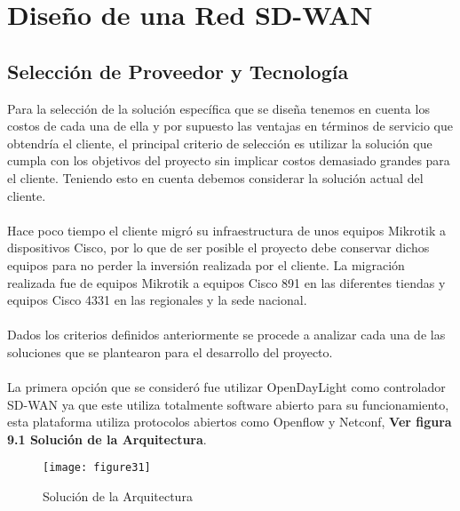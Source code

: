 \chapter{Diseño de una Red SD-WAN}
\label{cha:Diseño de una Red SD-WAN}

\section{Selección de Proveedor y Tecnología} %
\label{sec:Selección de Proveedor y Tecnología}

Para la selección de la solución específica que se diseña tenemos en cuenta los costos de cada una de ella y por supuesto las ventajas en términos de servicio que obtendría el cliente, el principal criterio de selección es utilizar la solución que cumpla con los objetivos del proyecto sin implicar costos demasiado grandes para el cliente. Teniendo esto en cuenta debemos considerar la solución actual del cliente.
\\
\\
Hace poco tiempo el cliente migró su infraestructura de unos equipos Mikrotik a dispositivos Cisco, por lo que de ser posible el proyecto debe conservar dichos equipos para no perder la inversión realizada por el cliente. La migración realizada fue de equipos Mikrotik a equipos Cisco 891 en las diferentes tiendas y equipos Cisco 4331 en las regionales y la sede nacional.
\\
\\
Dados los criterios definidos anteriormente se procede a analizar cada una de las soluciones que se plantearon para el desarrollo del proyecto.
\\
\\
La primera opción que se consideró fue utilizar OpenDayLight como controlador SD-WAN ya que este utiliza totalmente software abierto para su funcionamiento, esta plataforma utiliza protocolos abiertos como  Openflow y Netconf, \textbf{Ver figura 9.1 Solución de la Arquitectura}.



\begin{figure}[htbp]
  \centering
    {\texttt{[image: figure31]}}%
  \caption{Solución de la Arquitectura}
  \label{fig:fig2subfig}
\end{figure}

